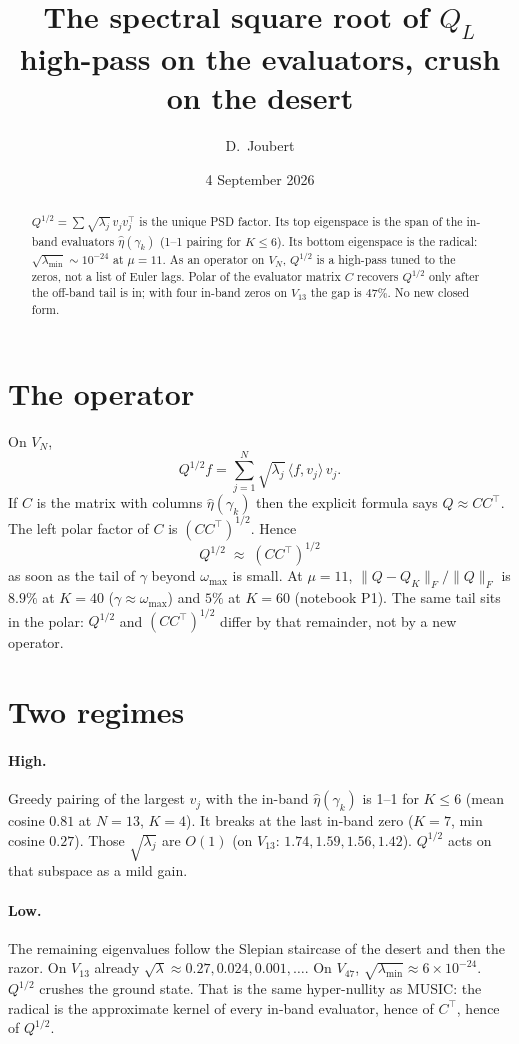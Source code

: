 \documentclass[11pt]{article}
\title{The spectral square root of $Q_L$\\
\large high-pass on the evaluators, crush on the desert}
\author{D.\ Joubert}
\date{4 September 2026}
\begin{document}
\maketitle
\begin{abstract}
\noindent
$Q^{1/2}=\sum\sqrt{\lambda_j}\,v_jv_j^{\!\top}$ is the unique PSD
factor. Its top eigenspace is the span of the in-band evaluators
$\hat\eta(\gamma_k)$ (1--1 pairing for $K\le6$). Its bottom eigenspace
is the radical: $\sqrt{\lambda_{\min}}\sim10^{-24}$ at $\mu=11$. As an
operator on $V_N$, $Q^{1/2}$ is a high-pass tuned to the zeros, not a
list of Euler lags. Polar of the evaluator matrix $C$ recovers
$Q^{1/2}$ only after the off-band tail is in; with four in-band zeros
on $V_{13}$ the gap is $47\%$. No new closed form.
\end{abstract}

\section{The operator}
On $V_N$,
\[
Q^{1/2}f=\sum_{j=1}^{N}\sqrt{\lambda_j}\,\langle f,v_j\rangle\,v_j.
\]
If $C$ is the matrix with columns $\hat\eta(\gamma_k)$ then the
explicit formula says $Q\approx CC^{\!\top}$. The left polar factor of
$C$ is $(CC^{\!\top})^{1/2}$. Hence
\[
Q^{1/2}\;\approx\;(CC^{\!\top})^{1/2}
\]
as soon as the tail of $\gamma$ beyond $\omega_{\max}$ is small.
At $\mu=11$, $\|Q-Q_K\|_F/\|Q\|_F$ is $8.9\%$ at $K=40$
($\gamma\approx\omega_{\max}$) and $5\%$ at $K=60$ (notebook P1). The
same tail sits in the polar: $Q^{1/2}$ and $(CC^{\!\top})^{1/2}$
differ by that remainder, not by a new operator.

\section{Two regimes}
\paragraph{High.}
Greedy pairing of the largest $v_j$ with the in-band $\hat\eta(\gamma_k)$
is 1--1 for $K\le6$ (mean cosine $0.81$ at $N=13$, $K=4$). It breaks
at the last in-band zero ($K=7$, min cosine $0.27$). Those
$\sqrt{\lambda_j}$ are $O(1)$ (on $V_{13}$: $1.74,1.59,1.56,1.42$).
$Q^{1/2}$ acts on that subspace as a mild gain.

\paragraph{Low.}
The remaining eigenvalues follow the Slepian staircase of the desert
and then the razor. On $V_{13}$ already $\sqrt{\lambda}\approx
0.27,0.024,0.001,\ldots$. On $V_{47}$, $\sqrt{\lambda_{\min}}\approx
6\times10^{-24}$. $Q^{1/2}$ crushes the ground state. That is the
same hyper-nullity as MUSIC: the radical is the approximate kernel of
every in-band evaluator, hence of $C^{\!\top}$, hence of $Q^{1/2}$.
\end{document}
